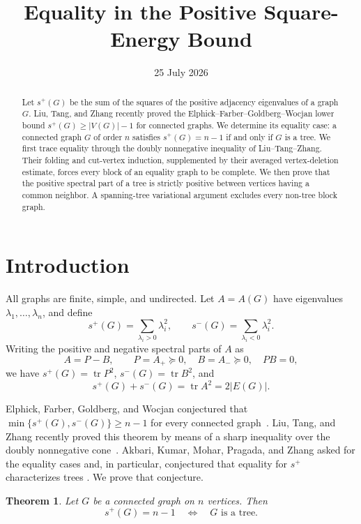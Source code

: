 \documentclass[11pt]{article}
\title{Equality in the Positive Square-Energy Bound}
\author{}
\date{25 July 2026}
\newtheorem{theorem}{Theorem}
\theoremstyle{remark}
\newcommand{\tr}{\operatorname{tr}}
\begin{document}
\maketitle

\begin{abstract}
Let $s^+(G)$ be the sum of the squares of the positive adjacency
eigenvalues of a graph $G$.  Liu, Tang, and Zhang recently proved the
Elphick--Farber--Goldberg--Wocjan lower bound $s^+(G)\geq |V(G)|-1$ for
connected graphs.  We determine its equality case: a connected graph $G$ of
order $n$ satisfies $s^+(G)=n-1$ if and only if $G$ is a tree.  We first
trace equality through the doubly nonnegative inequality of Liu--Tang--Zhang.
Their folding and cut-vertex induction, supplemented by their averaged
vertex-deletion estimate, forces every block of an equality graph to be
complete.  We then prove that the positive spectral part of a tree is
strictly positive between vertices having a common neighbor.  A spanning-tree
variational argument excludes every non-tree block graph.
\end{abstract}

\section{Introduction}

All graphs are finite, simple, and undirected.  Let $A=A(G)$ have eigenvalues
$\lambda_1,\ldots,\lambda_n$, and define
\[
 s^+(G)=\sum_{\lambda_i>0}\lambda_i^2,
 \qquad
 s^-(G)=\sum_{\lambda_i<0}\lambda_i^2.
\]
Writing the positive and negative spectral parts of $A$ as
\[
 A=P-B,\qquad P=A_+\succeq0,\quad B=A_-\succeq0,\quad PB=0,
\]
we have $s^+(G)=\tr P^2$, $s^-(G)=\tr B^2$, and
\begin{equation}\label{eq:sum-energy}
 s^+(G)+s^-(G)=\tr A^2=2|E(G)|.
\end{equation}

Elphick, Farber, Goldberg, and Wocjan conjectured that
$\min\{s^+(G),s^-(G)\}\geq n-1$ for every connected graph~\cite{EFGW}.
Liu, Tang, and Zhang recently proved this theorem by means of a sharp
inequality over the doubly nonnegative cone~\cite{LTZ}.  Akbari, Kumar,
Mohar, Pragada, and Zhang asked for the equality cases and, in particular,
conjectured that equality for $s^+$ characterizes trees
\cite[Conjecture~9.2(i)]{AKMPZ}.  We prove that conjecture.

\begin{theorem}\label{thm:main}
Let $G$ be a connected graph on $n$ vertices.  Then
\[
 s^+(G)=n-1
 \quad\Longleftrightarrow\quad
 G\text{ is a tree}.
\]
\end{theorem}
\end{document}
